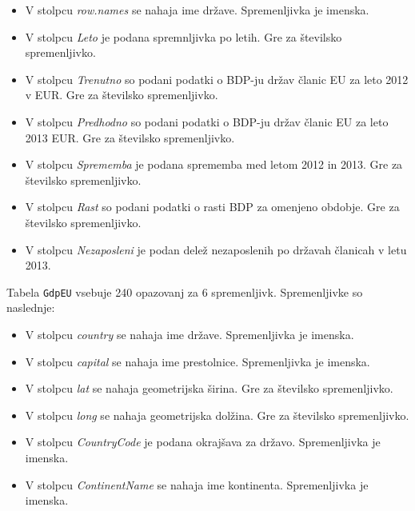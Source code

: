\documentclass[11pt,a4paper]{article}
\begin{document}
\begin{itemize}
  \item V stolpcu \textit{row.names} se nahaja ime države. Spremenljivka je imenska.
  \item V stolpcu \textit{Leto} je podana spremnljivka po letih. Gre za številsko spremenljivko.
  \item V stolpcu \textit{Trenutno} so podani podatki o BDP-ju držav članic EU za leto 2012 v EUR. Gre za številsko spremenljivko.
  \item V stolpcu \textit{Predhodno} so podani podatki o BDP-ju držav članic EU za leto 2013  EUR. Gre za številsko spremenljivko.
  \item V stolpcu \textit{Sprememba} je podana sprememba med letom 2012 in 2013. Gre za številsko spremenljivko.
  \item V stolpcu \textit{Rast} so podani podatki o rasti BDP za omenjeno obdobje. Gre za številsko spremenljivko.
  \item V stolpcu \textit{Nezaposleni} je podan delež nezaposlenih po državah članicah v letu 2013.
\end{itemize}

Tabela \verb|GdpEU| vsebuje 240 opazovanj za 6 spremenljivk. Spremenljivke so naslednje:

\begin{itemize}
  \item V stolpcu \textit{country} se nahaja ime države. Spremenljivka je imenska.
  \item V stolpcu \textit{capital} se nahaja ime prestolnice. Spremenljivka je imenska.
  \item V stolpcu \textit{lat} se nahaja geometrijska širina. Gre za številsko spremenljivko.
  \item V stolpcu \textit{long} se nahaja geometrijska dolžina. Gre za številsko spremenljivko.
  \item V stolpcu \textit{CountryCode} je podana okrajšava za državo. Spremenljivka je imenska.
  \item V stolpcu \textit{ContinentName} se nahaja ime kontinenta. Spremenljivka je imenska.
\end{itemize}


\pagebreak
\end{document}
